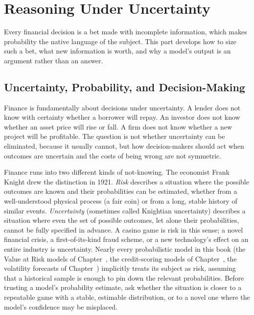 \documentclass[../ai_in_finance]{subfiles}
\begin{document}
\section{Reasoning Under Uncertainty}

Every financial decision is a bet made with incomplete information, which makes probability the native language of the subject. This part develops how to size such a bet, what new information is worth, and why a model's output is an argument rather than an answer.

\subsection{Uncertainty, Probability, and Decision-Making}

Finance is fundamentally about decisions under uncertainty. A lender does not know with certainty whether a borrower will repay. An investor does not know whether an asset price will rise or fall. A firm does not know whether a new project will be profitable. The question is not whether uncertainty can be eliminated, because it usually cannot, but how decision-makers should act when outcomes are uncertain and the costs of being wrong are not symmetric.

Finance runs into two different kinds of not-knowing. The economist Frank Knight drew the distinction in 1921. \emph{Risk} describes a situation where the possible outcomes are known and their probabilities can be estimated, whether from a well-understood physical process (a fair coin) or from a long, stable history of similar events. \emph{Uncertainty} (sometimes called Knightian uncertainty) describes a situation where even the set of possible outcomes, let alone their probabilities, cannot be fully specified in advance. A casino game is risk in this sense; a novel financial crisis, a first-of-its-kind fraud scheme, or a new technology's effect on an entire industry is uncertainty.
Nearly every probabilistic model in this book (the Value at Risk models of Chapter~, the credit-scoring models of Chapter~, the volatility forecasts of Chapter~) implicitly treats its subject as risk, assuming that a historical sample is enough to pin down the relevant probabilities. Before trusting a model's probability estimate, ask whether the situation is closer to a repeatable game with a stable, estimable distribution, or to a novel one where the model's confidence may be misplaced.
\end{document}
